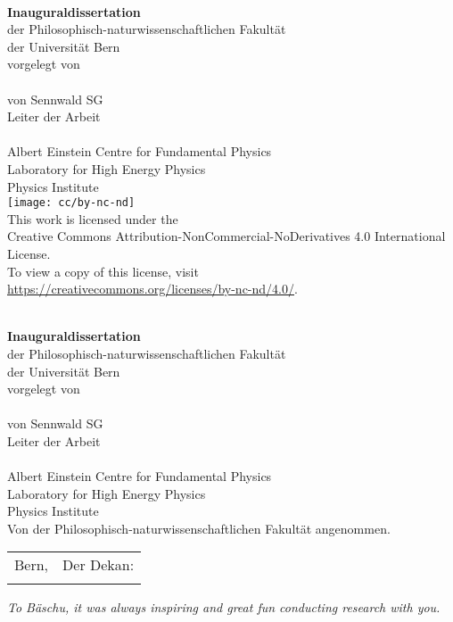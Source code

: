 \begin{titlepage}
	\begin{center}
		\null
		\vfill
		\textbf{\LARGE\Title}\\[20mm]
		\textbf{\large Inauguraldissertation}\\
		{\large der Philosophisch-naturwissenschaftlichen Fakultät}\\
		{\large der Universität Bern}\\[20mm]
		{\large vorgelegt von}\\[10mm]
		\textbf{\Large\Author}\\[10mm]
		{\large von Sennwald SG}\\[20mm]
		{\large Leiter der Arbeit}\\
		\textbf{\large\Supervisor}\\[10mm]
		{\large Albert Einstein Centre for Fundamental Physics}\\
		{\large Laboratory for High Energy Physics}\\
		{\large Physics Institute}\\[10mm]
		\texttt{[image: cc/by-nc-nd]}\\
		This work is licensed under the\\
		Creative Commons Attribution-NonCommercial-NoDerivatives 4.0 International License.\\
		To view a copy of this license, visit\\
		\url{https://creativecommons.org/licenses/by-nc-nd/4.0/}.
		\vfill
	\end{center}
	\clearpage
	\null
	\clearpage
	\begin{center}
		\null
		\vfill
		\textbf{\LARGE\Title}\\[20mm]
		\textbf{\large Inauguraldissertation}\\
		{\large der Philosophisch-naturwissenschaftlichen Fakultät}\\
		{\large der Universität Bern}\\[20mm]
		{\large vorgelegt von}\\[10mm]
		\textbf{\Large\Author}\\[10mm]
		{\large von Sennwald SG}\\[20mm]
		{\large Leiter der Arbeit}\\
		\textbf{\large\Supervisor}\\[10mm]
		{\large Albert Einstein Centre for Fundamental Physics}\\
		{\large Laboratory for High Energy Physics}\\
		{\large Physics Institute}\\[10mm]
		{\large Von der Philosophisch-naturwissenschaftlichen Fakultät angenommen.}\\[10mm]
		\begin{tabu} to \textwidth {Xl}
			{\large Bern, \Date} &	{\large Der Dekan:} \\
			&						{\large\Dean}
		\end{tabu}
		\vfill
	\end{center}
	\clearpage
\end{titlepage}


\null
\vfill
\emph{To Bäschu, it was always inspiring and great fun conducting research with you.}
\vfill
\clearpage